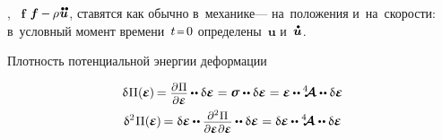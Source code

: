 \begin{otherlanguage}{russian}
 ,  ~$\bm{f}$  ${\bm{f} \hspace{-0.1ex} - \hspace{-0.1ex} \rho \hspace{.1ex} \mathdotdotabove{\bm{u}}}$, ставятся как обычно в~механике\:--- на~положения и~на~скорости: в~условный момент времени~${t \narroweq \hspace{.1ex} 0}$ определены~$\bm{u}$ и~$\mathdotabove{\bm{u}}$.

Плотность потенциальной энергии деформации

\nopagebreak\vspace{-0.2em}\begin{equation*}
\begin{gathered}
\variation{\hspace{.1ex}\potential}(\hspace{-0.1ex}\infinitesimaldeformation\hspace{-0.1ex}) \hspace{-0.2ex}
= \scalebox{0.9}{$ \displaystyle\frac{\raisemath{-0.16em}{\partial\hspace{.1ex} \potential}}{\partial \infinitesimaldeformation}$} \hspace{-0.1ex} \dotdotp \variation{\infinitesimaldeformation}
= \linearstress \dotdotp \variation{\infinitesimaldeformation}
= \infinitesimaldeformation \hspace{-0.1ex} \dotdotp \hspace{-0.1ex} \stiffnesstensor \dotdotp \variation{\infinitesimaldeformation}
\\[.1em]
%
\secondvariation{\hspace{.1ex}\potential}(\hspace{-0.1ex}\infinitesimaldeformation\hspace{-0.1ex}) \hspace{-0.2ex}
= \variation{\infinitesimaldeformation} \hspace{-0.1ex} \dotdotp \scalebox{0.9}{$ \displaystyle\frac{\raisemath{-0.16em}{\partial^2\hspace{.1ex} \potential}}{\partial \infinitesimaldeformation \hspace{.1ex} \partial \infinitesimaldeformation}$} \hspace{-0.1ex} \dotdotp \variation{\infinitesimaldeformation}
= \variation{\infinitesimaldeformation} \hspace{-0.1ex} \dotdotp \stiffnesstensor \dotdotp \variation{\infinitesimaldeformation}

\end{gathered}
\end{equation*}
\end{otherlanguage}
